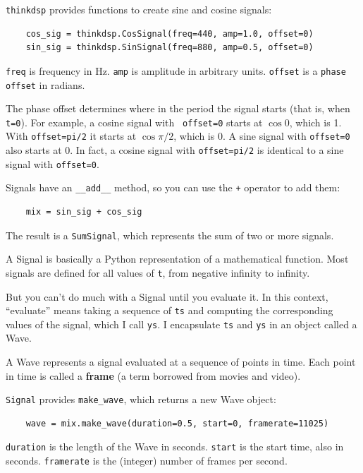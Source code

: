 \documentclass[12pt]{book}
\begin{document}
{\tt thinkdsp} provides functions to create sine and cosine signals:

\begin{verbatim}
    cos_sig = thinkdsp.CosSignal(freq=440, amp=1.0, offset=0)
    sin_sig = thinkdsp.SinSignal(freq=880, amp=0.5, offset=0)
\end{verbatim}

{\tt freq} is frequency in Hz.  {\tt amp} is amplitude in arbitrary
units.  {\tt offset} is a {\tt phase offset} in radians.

The phase offset determines where in the period the signal starts
(that is, when {\tt t=0}).  For example, a cosine signal with {\tt
  offset=0} starts at $\cos 0$, which is 1.  With {\tt offset=pi/2} it
starts at $\cos \pi/2$, which is 0.
A sine signal with
{\tt offset=0} also starts at 0.  In fact,
a cosine signal with {\tt offset=pi/2} is identical to a sine
signal with {\tt offset=0}.

Signals have an \verb"__add__" method, so you can use the {\tt +}
operator to add them:

\begin{verbatim}
    mix = sin_sig + cos_sig
\end{verbatim}

The result is a {\tt SumSignal}, which represents the sum of two
or more signals.

A Signal is basically a Python representation of a mathematical
function.  Most signals are defined for all values of {\tt t},
from negative infinity to infinity.

But you can't do much with a
Signal until you evaluate it.
In this context, ``evaluate'' means taking a sequence of {\tt ts}
and computing the corresponding values of the signal, which I
call {\tt ys}.  I encapsulate {\tt ts} and {\tt ys} in an
object called a Wave.

A Wave represents a signal evaluated at a sequence of points in
time.  Each point in time is called a {\bf frame} (a term borrowed
from movies and video).

{\tt Signal} provides \verb"make_wave", which returns a new
Wave object:

\begin{verbatim}
    wave = mix.make_wave(duration=0.5, start=0, framerate=11025)
\end{verbatim}

{\tt duration} is the length of the Wave in seconds.  {\tt start} is
the start time, also in seconds.  {\tt framerate} is the (integer)
number of frames per second.
\end{document}
